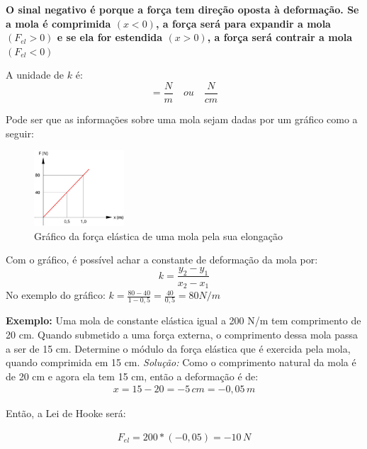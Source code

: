 \documentclass[12pt]{extarticle}
\newcommand{\<}{\langle}
\renewcommand{\>}{\rangle}
\theoremstyle{definition}
\begin{document}
\textbf{O sinal negativo é porque a força tem direção oposta à deformação. Se a mola é comprimida $(x<0)$, a força será para expandir a mola $(F_{el} >0)$ e se ela for estendida $(x>0)$, a força será contrair a mola $(F_{el}<0)$}

A unidade de $k$ é: 
\begin{equation}
    [k] = \frac{N}{m} \quad ou \quad \frac{N}{cm}
\end{equation}

Pode ser que as informações sobre uma mola sejam dadas por um gráfico como a seguir:
\begin{figure}[h]
    \centering
    \includegraphics[width=0.3\textwidth]{grafico-hooke.jpg}
    \caption{Gráfico da força elástica de uma mola pela sua elongação}
    \label{fig:hooke}
\end{figure}

Com o gráfico, é possível achar a constante de deformação da mola por:
\begin{equation}
    k = \frac{y_2-y_1}{x_2-x_1}
\end{equation}
No exemplo do gráfico: $k= \frac{80-40}{1-0,5} = \frac{40}{0,5} = 80 N/m$

\textbf{Exemplo:} Uma mola de constante elástica igual a 200 N/m tem comprimento de 20 cm. Quando submetido a uma força externa, o comprimento dessa mola passa a ser de 15 cm. Determine o módulo da força elástica que é exercida pela mola, quando comprimida em 15 cm.
\textit{Solução:}
Como o comprimento natural da mola é de 20 cm e agora ela tem 15 cm, então a deformação é de:
\begin{align*}
    x = 15-20 = -5\,cm = -0,05\, m
\end{align*}

Então, a Lei de Hooke será:

\begin{align*}
    F_{el} = 200*(-0,05) = -10\,N
\end{align*}
\end{document}
